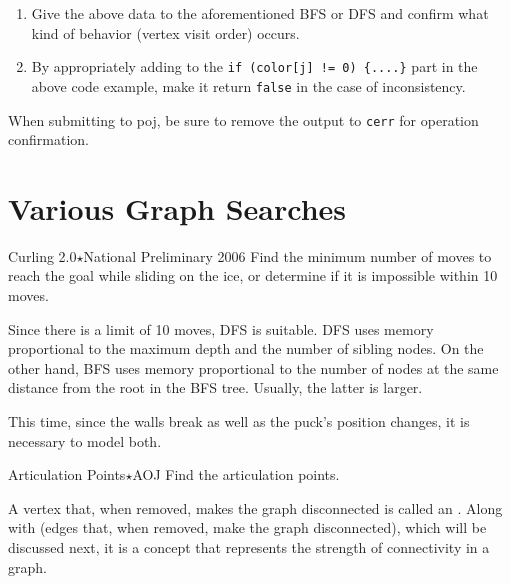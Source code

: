 \begin{enumerate}
\item Give the above data to the aforementioned BFS or DFS and confirm what kind of behavior (vertex visit order) occurs.
\item By appropriately adding to the \texttt{if (color[j] != 0) \{....\}} part in the above code example, make it return \texttt{false} in the case of inconsistency.
\end{enumerate}

When submitting to poj, be sure to remove the output to \texttt{cerr} for operation confirmation.
\section{Various Graph Searches}

\begin{pbox}{Curling 2.0$\star$}{National Preliminary 2006}
Find the minimum number of moves to reach the goal while sliding on the ice, or determine if it is impossible within 10 moves.

\end{pbox}

Since there is a limit of 10 moves, DFS is suitable.
DFS uses memory proportional to the maximum depth and the number of sibling nodes. On the other hand, BFS uses memory proportional to the number of nodes at the same distance from the root in the BFS tree. Usually, the latter is larger.

This time, since the walls break as well as the puck's position changes, it is necessary to model both.

\begin{pbox}{Articulation Points$\star$}{AOJ}
Find the articulation points.

\end{pbox}

A vertex that, when removed, makes the graph disconnected is called an .
Along with  (edges that, when removed, make the graph disconnected), which will be discussed next, it is a concept that represents the strength of connectivity in a graph.

